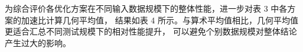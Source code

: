 为综合评价各优化方案在不同输入数据规模下的整体性能，进一步对表 3 中各方案的加速比计算几何平均值，
结果如表 4 所示。与算术平均值相比，几何平均值更适合汇总不同测试规模下的相对性能提升，
可以避免个别数据规模对整体结论产生过大的影响。

\begin{table}[H]
\centering
\caption{各方案在全部数据规模下的几何平均加速比}
\label{tab:average-speedup}

\end{table}

